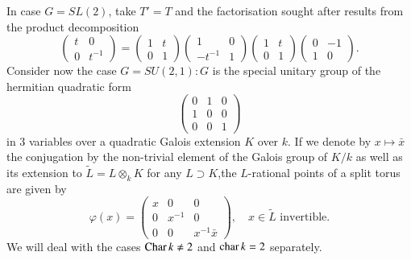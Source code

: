 In case $G = SL(2)$, take $T'= T$ and the factorisation sought after results from the product decomposition
$$
\left(\begin{matrix}
t & 0\\
0 & t^{-1}
\end{matrix}\right)  = 
\left(\begin{matrix}
1 & t \\
0 & 1
\end{matrix} \right) \left(\begin{matrix}
1 & 0\\
-t^{-1} & 1 
\end{matrix} \right) \left(\begin{matrix}
1 & t \\
0 &1
\end{matrix} \right) \left(\begin{matrix}
0 & -1\\
1& 0
\end{matrix} \right).
$$
Consider now the case $G = SU(2,1): G$ is the special unitary group of the hermitian quadratic form
$$
\left(\begin{matrix}
0 & 1 & 0 \\
1 & 0 & 0 \\
0 & 0 & 1
\end{matrix} \right)
$$
in 3 variables over a quadratic Galois extension $K$ over $k$. If we denote by $x \mapsto \bar{x}$ the conjugation by the non-trivial element of the Galois group of $K/k$ as well as its extension to $\tilde{L} = L \otimes_k K$ for any 
$L \supset K$,\pageoriginale the $L$-rational points of a split torus are given by
$$
\varphi (x) = \left(\begin{matrix}
x & 0 & 0\\
0 & x^{-1} &  0\\
0 & 0 & x^{-1} \bar{x}
\end{matrix} \right), \quad x \in \tilde{L} \text{ invertible.}
$$
We will deal with the cases $\operatorname{Char} k \neq 2$ and $\operatorname{char} k =2 $ separately.


